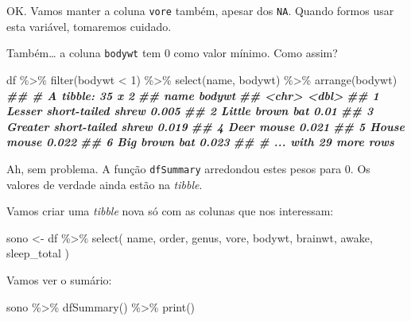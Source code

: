 \documentclass[
  11pt]{report}
\newenvironment{Shaded}{\begin{snugshade}}{\end{snugshade}}
\newcommand{\DecValTok}[1]{\textcolor[rgb]{0.00,0.00,0.81}{#1}}
\newcommand{\DocumentationTok}[1]{\textcolor[rgb]{0.56,0.35,0.01}{\textbf{\textit{#1}}}}
\newcommand{\FunctionTok}[1]{\textcolor[rgb]{0.00,0.00,0.00}{#1}}
\newcommand{\NormalTok}[1]{#1}
\newcommand{\OtherTok}[1]{\textcolor[rgb]{0.56,0.35,0.01}{#1}}
\newcommand{\SpecialCharTok}[1]{\textcolor[rgb]{0.00,0.00,0.00}{#1}}
\begin{document}
OK. Vamos manter a coluna \texttt{vore} também, apesar dos \texttt{NA}. Quando formos usar esta variável, tomaremos cuidado.

Também\ldots{} a coluna \texttt{bodywt} tem 0 como valor mínimo. Como assim?

\begin{Shaded}
\begin{Highlighting}[]
\NormalTok{df }\SpecialCharTok{\%\textgreater{}\%} 
  \FunctionTok{filter}\NormalTok{(bodywt }\SpecialCharTok{\textless{}} \DecValTok{1}\NormalTok{) }\SpecialCharTok{\%\textgreater{}\%} 
  \FunctionTok{select}\NormalTok{(name, bodywt) }\SpecialCharTok{\%\textgreater{}\%} 
  \FunctionTok{arrange}\NormalTok{(bodywt)}
\DocumentationTok{\#\# \# A tibble: 35 x 2}
\DocumentationTok{\#\#   name                       bodywt}
\DocumentationTok{\#\#   \textless{}chr\textgreater{}                       \textless{}dbl\textgreater{}}
\DocumentationTok{\#\# 1 Lesser short{-}tailed shrew   0.005}
\DocumentationTok{\#\# 2 Little brown bat            0.01 }
\DocumentationTok{\#\# 3 Greater short{-}tailed shrew  0.019}
\DocumentationTok{\#\# 4 Deer mouse                  0.021}
\DocumentationTok{\#\# 5 House mouse                 0.022}
\DocumentationTok{\#\# 6 Big brown bat               0.023}
\DocumentationTok{\#\# \# ... with 29 more rows}
\end{Highlighting}
\end{Shaded}

Ah, sem problema. A função \texttt{dfSummary} arredondou estes pesos para 0. Os valores de verdade ainda estão na \emph{tibble}.

Vamos criar uma \emph{tibble} nova só com as colunas que nos interessam:

\begin{Shaded}
\begin{Highlighting}[]
\NormalTok{sono }\OtherTok{\textless{}{-}}\NormalTok{ df }\SpecialCharTok{\%\textgreater{}\%} 
  \FunctionTok{select}\NormalTok{(}
\NormalTok{    name, order, genus, vore, bodywt, }
\NormalTok{    brainwt, awake, sleep\_total}
\NormalTok{  )}
\end{Highlighting}
\end{Shaded}

Vamos ver o sumário:

\begin{Shaded}
\begin{Highlighting}[]
\NormalTok{sono }\SpecialCharTok{\%\textgreater{}\%} \FunctionTok{dfSummary}\NormalTok{() }\SpecialCharTok{\%\textgreater{}\%} \FunctionTok{print}\NormalTok{()}
\end{Highlighting}
\end{Shaded}
\end{document}
